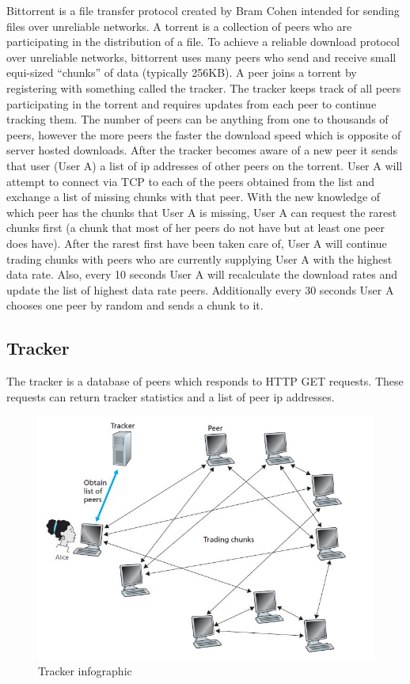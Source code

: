 \documentclass[letter]{scrartcl}
\begin{document}
Bittorrent is a file transfer protocol created by Bram Cohen intended for sending files over unreliable networks.  A torrent is a collection of peers who are participating in the distribution of a file.  To achieve a reliable download protocol over unreliable networks, bittorrent uses many peers who send and receive small equi-sized “chunks” of data (typically 256KB).  A peer joins a torrent by registering with something called the tracker.  The tracker keeps track of all peers participating in the torrent and requires updates from each peer to continue tracking them.  The number of peers can be anything from one to thousands of peers, however the more peers the faster the download speed which is opposite of server hosted downloads.  After the tracker becomes aware of a new peer it sends that user (User A) a list of ip addresses of other peers on the torrent.  User A will attempt to connect via TCP to each of the peers obtained from the list and exchange a list of missing chunks with that peer.  With the new knowledge of which peer has the chunks that User A is missing, User A can request the rarest chunks first (a chunk that most of her peers do not have but at least one peer does have).  After the rarest first have been taken care of, User A will continue trading chunks with peers who are currently supplying User A with the highest data rate.  Also, every 10 seconds User A will recalculate the download rates and update the list of highest data rate peers.  Additionally every 30 seconds User A chooses one peer by random and sends a chunk to it. 

\subsection{Tracker}
	The tracker is a database of peers which responds to HTTP GET requests.  These requests can return tracker statistics and a list of peer ip addresses.

\begin{figure}[ht!]
\centering
\includegraphics[width=120mm]{infographic.jpg}
\caption{Tracker infographic}
\label{overflow}
\end{figure}
\end{document}
